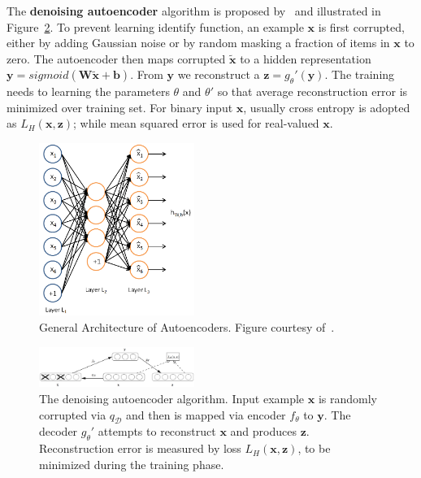 The \textbf{denoising autoencoder} algorithm is proposed by~\cite{DenoiseAE} and illustrated in
Figure~\ref{Fig:dAEAlgorithm}.
To prevent learning identify function, an example $\bm{x}$ is first corrupted, either by
adding Gaussian noise or by random masking a fraction of items in $\bm{x}$ to zero.
The autoencoder then maps corrupted $\bm{\tilde{x}}$ to a hidden representation $\bm{y} = sigmoid(\bm{W}\tilde{\bm{x}} + \bm{b})$.
From $\bm{y}$ we reconstruct a $\bm{z}=g_\theta'(\bm{y})$.
The training needs to learning the parameters $\theta$ and $\theta'$ so that average reconstruction error is minimized over training set.
For binary input $\bm{x}$, usually cross entropy is adopted as $L_H(\bm{x}, \bm{z})$;
while mean squared error is used for real-valued $\bm{x}$.

\begin{figure}[h]
\centering
\includegraphics[width=0.45\textwidth]{figures/autoencoder.png}
\caption{General Architecture of Autoencoders.
        Figure courtesy of~\cite{UFLDLAutoencoder}.}
\label{Fig:AEArchitecture}
\end{figure}

\begin{figure}[h]
\centering
\includegraphics[width=0.45\textwidth]{figures/denoiseautoencoder.png}
        \caption{The denoising autoencoder algorithm.
        Input example $\bm{x}$ is randomly corrupted via $q_\mathcal{D}$ and then
        is mapped via encoder $f_\theta$ to $\bm{y}$.
        The decoder $g_\theta'$ attempts to reconstruct $\bm{x}$ and produces $\bm{z}$.
        Reconstruction error is measured by loss $L_H(\bm{x}, \bm{z})$, to be minimized
        during the training phase.}
\label{Fig:dAEAlgorithm}
\end{figure}

